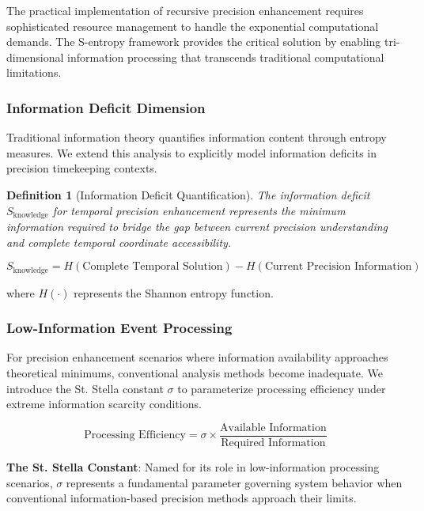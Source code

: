 \documentclass[12pt,a4paper]{article}
\newtheorem{definition}[theorem]{Definition}
\begin{document}
{The practical implementation of recursive precision enhancement requires sophisticated resource management to handle the exponential computational demands. The S-entropy framework provides the critical solution by enabling tri-dimensional information processing that transcends traditional computational limitations.

\subsubsection{Information Deficit Dimension}

Traditional information theory quantifies information content through entropy measures. We extend this analysis to explicitly model information deficits in precision timekeeping contexts.

\begin{definition}[Information Deficit Quantification]
The information deficit $S_{\text{knowledge}}$ for temporal precision enhancement represents the minimum information required to bridge the gap between current precision understanding and complete temporal coordinate accessibility.
\end{definition}

\begin{equation}
S_{\text{knowledge}} = H(\text{Complete Temporal Solution}) - H(\text{Current Precision Information})
\label{eq:information_deficit}
\end{equation}

where $H(\cdot)$ represents the Shannon entropy function.

\subsubsection{Low-Information Event Processing}

For precision enhancement scenarios where information availability approaches theoretical minimums, conventional analysis methods become inadequate. We introduce the St. Stella constant $\sigma$ to parameterize processing efficiency under extreme information scarcity conditions.

\begin{equation}
\text{Processing Efficiency} = \sigma \times \frac{\text{Available Information}}{\text{Required Information}}
\label{eq:stella_constant}
\end{equation}

\textbf{The St. Stella Constant}: Named for its role in low-information processing scenarios, $\sigma$ represents a fundamental parameter governing system behavior when conventional information-based precision methods approach their limits.

}
\end{document}
